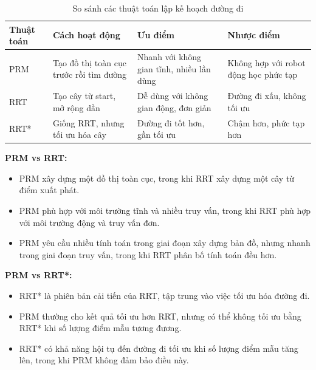 \documentclass[12pt,a4paper,openany,oneside]{report}
\begin{document}
\begin{table}[h]
\centering
\begin{tabular}{|p{2cm}|p{4cm}|p{4cm}|p{4cm}|}
\hline
\textbf{Thuật toán} & \textbf{Cách hoạt động} & \textbf{Ưu điểm} & \textbf{Nhược điểm} \\
\hline
PRM & Tạo đồ thị toàn cục trước rồi tìm đường & Nhanh với không gian tĩnh, nhiều lần dùng & Không hợp với robot động học phức tạp \\
\hline
RRT & Tạo cây từ start, mở rộng dần & Dễ dùng với không gian động, đơn giản & Đường đi xấu, không tối ưu \\
\hline
RRT* & Giống RRT, nhưng tối ưu hóa cây & Đường đi tốt hơn, gần tối ưu & Chậm hơn, phức tạp hơn \\
\hline
\end{tabular}
\caption{So sánh các thuật toán lập kế hoạch đường đi}
\label{tab:comparison}
\end{table}

\textbf{PRM vs RRT:}
\begin{itemize}
    \item PRM xây dựng một đồ thị toàn cục, trong khi RRT xây dựng một cây từ điểm xuất phát.
    \item PRM phù hợp với môi trường tĩnh và nhiều truy vấn, trong khi RRT phù hợp với môi trường động và truy vấn đơn.
    \item PRM yêu cầu nhiều tính toán trong giai đoạn xây dựng bản đồ, nhưng nhanh trong giai đoạn truy vấn, trong khi RRT phân bố tính toán đều hơn.
\end{itemize}

\textbf{PRM vs RRT*:}
\begin{itemize}
    \item RRT* là phiên bản cải tiến của RRT, tập trung vào việc tối ưu hóa đường đi.
    \item PRM thường cho kết quả tối ưu hơn RRT, nhưng có thể không tối ưu bằng RRT* khi số lượng điểm mẫu tương đương.
    \item RRT* có khả năng hội tụ đến đường đi tối ưu khi số lượng điểm mẫu tăng lên, trong khi PRM không đảm bảo điều này.
\end{itemize}
\end{document}
